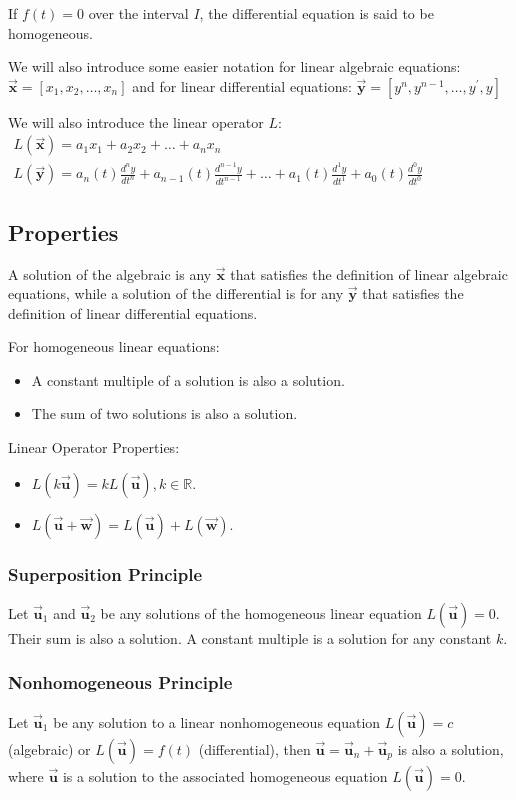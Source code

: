 \documentclass[12pt,landscape,twocolumn]{article}
\let\oldvec\vec
\renewcommand{\vec}[1]{\oldvec{\mathbf{ #1 } } }                    %
\begin{document}
If $f(t)=0$ over the interval $I$, the differential equation is said to be homogeneous.

We will also introduce some easier notation for linear algebraic equations:
$
\vec{x} = [x_1, x_2, \dots, x_n]
$
and for linear differential equations:
$
\vec{y} = [y^n, y^{n-1}, \dots, y^\prime, y]
$

We will also introduce the linear operator $L$:
$
\begin{aligned}
L(\vec{x}) = a_1x_1 + a_2x_2 + \dots + a_nx_n\\
L(\vec{y}) = a_n(t) \frac{d^ny}{dt^n} + a_{n-1}(t) \frac{d^{n-1}y}{dt^{n-1} } + \dots + a_1(t) \frac{d^1y}{dt^1} + a_0(t) \frac{d^0y}{dt^0}
\end{aligned}
$

    \subsection{Properties}
    A solution of the algebraic is any $\vec{x}$ that satisfies the definition of linear algebraic equations, while a solution of the differential is for any $\vec{y}$ that satisfies the definition of linear differential equations.

    For homogeneous linear equations:
    \begin{itemize}
    \item A constant multiple of a solution is also a solution.
    \item The sum of two solutions is also a solution.
    \end{itemize}

    Linear Operator Properties:
    \begin{itemize}
    \item $L(k \vec{u}) = k L(\vec{u}), k \in \mathbb{R}$.
    \item $L(\vec{u} + \vec{w}) = L(\vec{u}) + L(\vec{w})$.
    \end{itemize}

    \subsubsection{Superposition Principle}
    Let $\vec{u}_1$ and $\vec{u}_2$ be any solutions of the homogeneous linear equation $L(\vec{u}) = 0$. Their sum is also a solution. A constant multiple is a solution for any constant $k$.

    \subsubsection{Nonhomogeneous Principle}
    Let $\vec{u}_1$ be any solution to a linear nonhomogeneous equation $L(\vec{u}) = c$ (algebraic) or $L(\vec{u}) = f(t)$ (differential), then $\vec{u} = \vec{u}_n + \vec{u}_p$ is also a solution, where $\vec{u}$ is a solution to the associated homogeneous equation $L(\vec{u}) = 0$.
\end{document}
